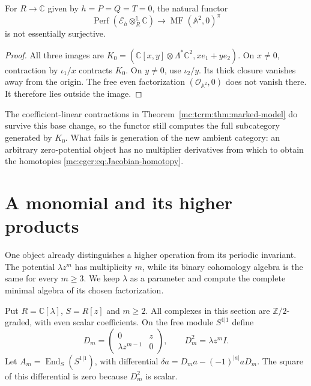 \begin{proposition}\label{mc:cgcr:prop:specialization}
For $R\to\mathbb C$ given by $h=P=Q=T=0$, the natural functor
\[
 \operatorname{Perf}(\mathcal E_h\otimes_R^{\mathbb L}\mathbb C)
       \longrightarrow\operatorname{MF}(\mathbb A^2,0)^\pi
\]
is not essentially surjective.
\end{proposition}

\begin{proof}
All three images are
$K_0=(\mathbb C[x,y]\otimes\Lambda^*\mathbb C^2,xe_1+ye_2)$.
On $x\ne0$, contraction by $\iota_1/x$ contracts $K_0$.
On $y\ne0$, use $\iota_2/y$. Its thick closure vanishes
away from the origin. The free even factorization
$(\mathcal O_{\mathbb A^2},0)$ does not vanish there.
It therefore lies outside the image.
\end{proof}

The coefficient-linear contractions in
Theorem~\ref{mc:tcrm:thm:marked-model} do survive this base
change, so the functor still computes the full subcategory
generated by $K_0$. What fails is generation of the new
ambient category: an arbitrary zero-potential object has
no multiplier derivatives from which to obtain the
homotopies \eqref{mc:cgcr:eq:Jacobian-homotopy}.

\section{A monomial and its higher products}
\label{mc:rmf:sec:monomial}

One object already distinguishes a higher operation from
its periodic invariant. The potential $\lambda z^m$ has
multiplicity $m$, while its binary cohomology algebra is
the same for every $m\ge3$.
We keep $\lambda$ as a parameter and compute the complete
minimal algebra of its chosen factorization.

Put $R=\mathbb C[\lambda]$, $S=R[z]$ and $m\ge2$.
All complexes in this section are $\mathbb Z/2$-graded,
with even scalar coefficients. On the free module
$S^{1|1}$ define
\begin{equation}\label{mc:rmf:eq:factorization}
 D_m=\begin{pmatrix}0&z\\\lambda z^{m-1}&0\end{pmatrix},
 \qquad D_m^2=\lambda z^m I.
\end{equation}
Let $A_m=\operatorname{End}_S(S^{1|1})$, with differential
$\delta a=D_ma-(-1)^{|a|}aD_m$.
The square of this differential is zero because $D_m^2$
is scalar.

